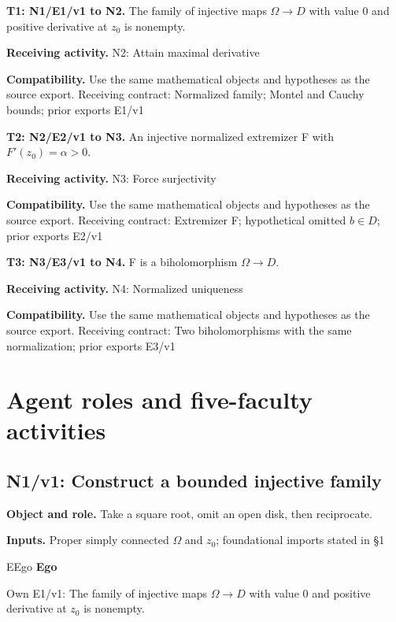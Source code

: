 \documentclass[preprint,12pt,aps,pra,showkeys,amsmath,amssymb,superscriptaddress,floatfix]{revtex4-2}
\theoremstyle{definition}
\theoremstyle{remark}
\newcommand{\mmfaculty}[3]{%
 \begin{mmfacultybox}{#1}{#2}
 {\sffamily\bfseries\color{MMBlue}#2}\par\smallskip #3
 \end{mmfacultybox}}
\newcommand{\field}[2]{\par\smallskip\noindent\textbf{#1.} #2\par}
\begin{document}
\begingroup\small\linespread{1.05}\selectfont

\field{T1: N1/E1/v1 to N2}{The family of injective maps \(\Omega \to D\) with value 0 and positive
derivative at \(z_{0}\) is nonempty.}

\field{Receiving activity}{N2: Attain maximal derivative}

\field{Compatibility}{Use the same mathematical objects and hypotheses as the source export.
Receiving contract: Normalized family; Montel and Cauchy bounds; prior
exports E1/v1}

\field{T2: N2/E2/v1 to N3}{An injective normalized extremizer F with \(F'(z_{0})=\alpha >0\).}

\field{Receiving activity}{N3: Force surjectivity}

\field{Compatibility}{Use the same mathematical objects and hypotheses as the source export.
Receiving contract: Extremizer F; hypothetical omitted \(b\in D\); prior
exports E2/v1}

\field{T3: N3/E3/v1 to N4}{F is a biholomorphism \(\Omega \to D\).}

\field{Receiving activity}{N4: Normalized uniqueness}

\field{Compatibility}{Use the same mathematical objects and hypotheses as the source export.
Receiving contract: Two biholomorphisms with the same normalization;
prior exports E3/v1}

\endgroup

\clearpage\section{Agent roles and five-faculty activities}\begingroup\small\linespread{1.05}\selectfont{}

\subsection{N1/v1: Construct a bounded injective family}

\field{Object and role}{Take a square root, omit an open disk, then reciprocate.}

\field{Inputs}{Proper simply connected \(\Omega\) and \(z_{0}\); foundational imports
stated in §1}

\mmfaculty{E}{Ego}{Own E1/v1: The family of injective maps \(\Omega \to D\) with value 0
and positive derivative at \(z_{0}\) is nonempty.}
\end{document}
